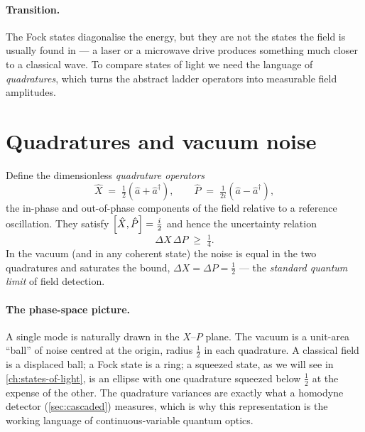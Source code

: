 \paragraph{Transition.}
The Fock states diagonalise the energy, but they are not the states
the field is usually found in --- a laser or a microwave drive
produces something much closer to a classical wave. To compare
states of light we need the language of \emph{quadratures}, which
turns the abstract ladder operators into measurable field
amplitudes.

\section{Quadratures and vacuum noise}
\label{sec:quadratures}

\begin{statement}
\label{stmt:quadratures}
Define the dimensionless \emph{quadrature operators}
\begin{equation}
\label{eq:quadratures}
\hat X \;=\; \tfrac12(\hat a + \hat a^\dagger),
\qquad
\hat P \;=\; \tfrac{1}{2i}(\hat a - \hat a^\dagger),
\end{equation}
the in-phase and out-of-phase components of the field relative to a
reference oscillation. They satisfy $\comm{\hat X}{\hat P}=\tfrac{i}{2}$
and hence the uncertainty relation
\begin{equation}
\label{eq:quadrature-uncertainty}
\Delta X\,\Delta P \;\geq\; \tfrac14.
\end{equation}
In the vacuum (and in any coherent state) the noise is equal in the
two quadratures and saturates the bound,
$\Delta X=\Delta P=\tfrac12$ --- the \emph{standard quantum limit}
of field detection.
\end{statement}

\paragraph{The phase-space picture.}
A single mode is naturally drawn in the $X$--$P$ plane. The vacuum
is a unit-area ``ball'' of noise centred at the origin, radius
$\tfrac12$ in each quadrature. A classical field is a displaced
ball; a Fock state is a ring; a squeezed state, as we will see in
\cref{ch:states-of-light}, is an ellipse with one quadrature
squeezed below $\tfrac12$ at the expense of the other. The quadrature
variances are exactly what a homodyne detector
(\cref{sec:cascaded}) measures, which is why this representation is
the working language of continuous-variable quantum optics.


